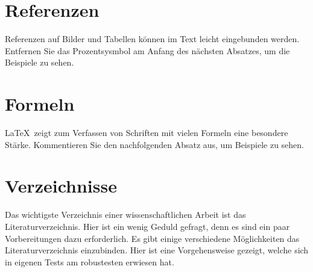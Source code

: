 \documentclass[ngerman]{book}	%
\begin{document}

\chapter{Referenzen}

Referenzen auf Bilder und Tabellen können im Text leicht eingebunden werden. Entfernen Sie das Prozentsysmbol am Anfang des nächsten Absatzes, um die Beispiele zu sehen.


\chapter{Formeln}

\LaTeX\, zeigt zum Verfassen von Schriften mit vielen Formeln eine besondere Stärke. Kommentieren Sie den nachfolgenden Absatz aus, um Beispiele zu sehen.



\chapter{Verzeichnisse}

Das wichtigste Verzeichnis einer wissenschaftlichen Arbeit ist das Literaturverzeichnis. Hier ist ein wenig Geduld gefragt, denn es sind ein paar Vorbereitungen dazu erforderlich. Es gibt einige verschiedene Möglichkeiten das Literaturverzeichnis einzubinden. Hier ist eine Vorgehensweise gezeigt, welche sich in eigenen Tests am robustesten erwiesen hat.
\end{document}
